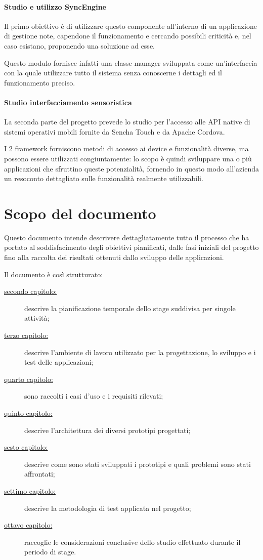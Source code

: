 \paragraph*{Studio e utilizzo SyncEngine}
Il primo obiettivo è di utilizzare questo componente all'interno di un applicazione di gestione note, capendone il funzionamento e cercando possibili criticità e, nel caso esistano, proponendo una soluzione ad esse.

Questo modulo fornisce infatti una classe manager sviluppata come un'interfaccia con la quale utilizzare tutto il sistema senza conoscerne i dettagli ed il funzionamento preciso.

\paragraph*{Studio interfacciamento sensoristica}
La seconda parte del progetto prevede lo studio per l'accesso alle \ac{API} native di sistemi operativi mobili fornite da Sencha Touch e da Apache Cordova.

I 2 framework forniscono metodi di accesso ai device e funzionalità diverse, ma possono essere utilizzati congiuntamente: lo scopo è quindi sviluppare una o più applicazioni che sfruttino queste potenzialità, fornendo in questo modo all'azienda un resoconto dettagliato sulle funzionalità realmente utilizzabili.

\section{Scopo del documento}
Questo documento intende descrivere dettagliatamente tutto il processo che ha portato al soddisfacimento degli obiettivi pianificati, dalle fasi iniziali del progetto fino alla raccolta dei risultati ottenuti dallo sviluppo delle applicazioni.

Il documento è così strutturato:
\begin{description}
\item[{\hyperref[ch:pianificazione]{secondo capitolo:}}] descrive la pianificazione temporale dello stage suddivisa per singole attività; 
\item[{\hyperref[ch:ambiente]{terzo capitolo:}}] descrive l'ambiente di lavoro utilizzato per la progettazione, lo sviluppo e i test delle applicazioni;
\item[{\hyperref[ch:requisiti]{quarto capitolo:}}] sono raccolti i casi d'uso e i requisiti rilevati;
\item[{\hyperref[ch:progettazione]{quinto capitolo:}}] descrive l'architettura dei diversi prototipi progettati;
\item[{\hyperref[ch:sviluppo]{sesto capitolo:}}] descrive come sono stati sviluppati i prototipi e quali problemi sono stati affrontati;
\item[{\hyperref[ch:test]{settimo capitolo:}}] descrive la metodologia di test applicata nel progetto;
\item[{\hyperref[ch:conclusioni]{ottavo capitolo:}}] raccoglie le considerazioni conclusive dello studio effettuato durante il periodo di stage.
\end{description}

